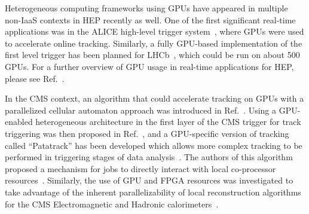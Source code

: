 Heterogeneous computing frameworks using GPUs have appeared in multiple non-IaaS contexts in HEP recently as well. One of the first significant real-time applications was in the ALICE high-level trigger system~\cite{ALICE:2018phe}, where GPUs were used to accelerate online tracking. Similarly, a fully GPU-based implementation of the first level trigger has been planned for LHCb~\cite{Aaij:2019zbu}, which could be run on about 500 GPUs. For a further overview of GPU usage in real-time applications for HEP, please see Ref.~\cite{VomBruch:2020plx}.

In the CMS context, an algorithm that could accelerate tracking on GPUs with a parallelized cellular automaton approach was introduced in Ref.~\cite{Funke:2014dga}. Using a GPU-enabled heterogeneous architecture in the first layer of the CMS trigger for track triggering was then proposed in Ref.~\cite{Pantaleo:2016ery}, and a GPU-specific version of tracking called ``Patatrack'' has been developed which allows more complex tracking to be performed in triggering stages of data analysis~\cite{Bocci:2020pmi}. The authors of this algorithm proposed a mechanism for \CMSSW jobs to directly interact with local co-processor resources~\cite{Bocci:2020olh}. Similarly, the use of GPU and FPGA resources was investigated to take advantage of the inherent parallelizability of local reconstruction algorithms for the CMS Electromagnetic and Hadronic calorimeters~\cite{Massironi_2020}.%



